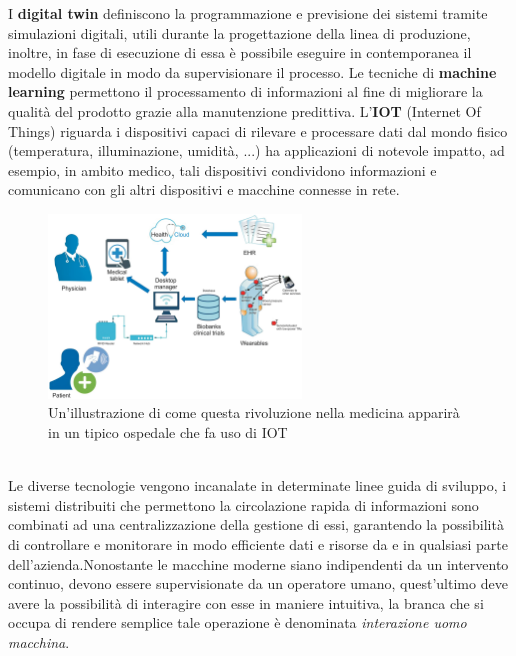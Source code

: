 \documentclass[10pt, letterpaper]{report}
\begin{document}
I \textbf{digital twin} definiscono la programmazione e previsione dei sistemi tramite simulazioni digitali, utili durante la 
progettazione della linea di produzione, inoltre, in fase di esecuzione di essa è possibile eseguire in contemporanea il modello 
digitale in modo da supervisionare il processo.\acc 
Le tecniche di \textbf{machine learning} permettono il processamento di informazioni al fine di migliorare la qualità del 
prodotto grazie alla manutenzione predittiva.\acc 
L'\textbf{IOT} (Internet Of Things) riguarda i dispositivi capaci di rilevare e processare dati 
dal mondo fisico (temperatura,
illuminazione, umidità, ...) ha applicazioni di notevole impatto, ad esempio, in ambito medico, tali dispositivi 
condividono informazioni e comunicano con gli altri dispositivi e macchine connesse in rete.\\\begin{figure}[h!]
    \centering
    \includegraphics[width=0.6\textwidth ]{images/iot.jpg}
    \caption{Un'illustrazione di come questa rivoluzione 
    nella medicina apparirà in un tipico ospedale che fa uso di IOT}
\end{figure}\\
Le diverse tecnologie vengono incanalate in determinate linee guida di sviluppo, i sistemi distribuiti che permettono 
la circolazione rapida di informazioni sono combinati ad una centralizzazione della gestione di essi, garantendo la possibilità 
di controllare e monitorare in modo efficiente dati e risorse da e in qualsiasi parte dell'azienda.\acc Nonostante le 
macchine moderne siano indipendenti da un intervento continuo, devono essere supervisionate da un operatore umano, 
quest'ultimo deve avere la possibilità di interagire  con esse in maniere intuitiva, la branca che si occupa di rendere 
semplice tale operazione è denominata \textit{interazione uomo macchina}.
\end{document}
